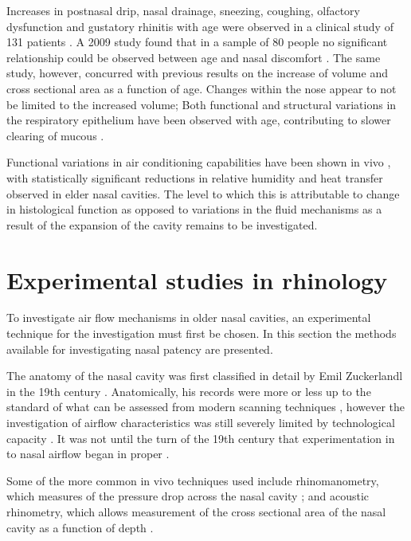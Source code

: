Increases in postnasal drip, nasal drainage, sneezing, coughing, olfactory dysfunction and gustatory rhinitis with age were observed in a clinical study of 131 patients \cite{Edelstein1996}. A 2009 study found that in a sample of 80 people no significant relationship could be observed between age and nasal discomfort \cite{Lindemann2010}. The same study, however, concurred with previous results on the increase of volume and cross sectional area as a function of age. Changes within the nose appear to not be limited to the increased volume; Both functional and structural variations in the respiratory epithelium have been observed with age, contributing to slower clearing of mucous \cite{HO2001}. 

Functional variations in air conditioning capabilities have been shown in vivo \cite{Lindemann2008}, with statistically significant reductions in relative humidity and heat transfer observed in elder nasal cavities. The level to which this is attributable to change in histological function as opposed to variations in the fluid mechanisms as a result of the expansion of the cavity remains to be investigated.

 \section{Experimental studies in rhinology}
 
To investigate air flow mechanisms in older nasal cavities, an experimental technique for the investigation must first be chosen. In this section the methods available for investigating nasal patency are presented.

The anatomy of the nasal cavity was first classified in detail by Emil Zuckerlandl in the 19th century \cite{Stammberger1989}. Anatomically, his records were more or less up to the standard of what can be assessed from modern scanning techniques \cite{Stammberger1989}, however the investigation of airflow characteristics was still severely limited by technological capacity \cite{Eccles2000}. It was not until the turn of the 19th century that experimentation in to nasal airflow began in proper \cite{Eccles2000}. 

Some of the more common in vivo techniques used include rhinomanometry, which measures of the pressure drop across the nasal cavity \cite{Hilberg1989}; and acoustic rhinometry, which allows measurement of the cross sectional area of the nasal cavity as a function of depth \cite{Hilberg1989}. 

